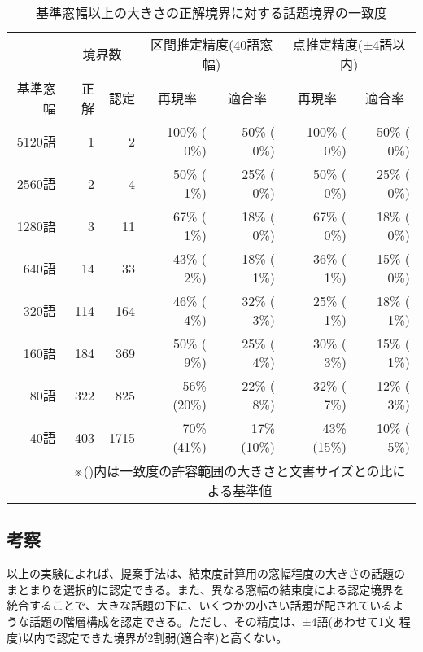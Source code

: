 \begin{table}[htbp]
  \begin{center}
    \leavevmode
    \caption{基準窓幅以上の大きさの正解境界に対する話題境界の一致度}
    \label{tab:大きさ別の再現率と適合率(総合)}
    
    
    \begin{tabular}{|r||r|r||r|r||r|r|}
      \hline
      & \multicolumn{2}{c||}{境界数}
      & \multicolumn{2}{c||}{区間推定精度(40語窓幅)}
      & \multicolumn{2}{c|}{点推定精度(±4語以内)} \\
      \cline{2-7}
      基準窓幅  & 正解 & 認定
        & \multicolumn{1}{c|}{再現率} & \multicolumn{1}{c||}{適合率}
        & \multicolumn{1}{c|}{再現率} & \multicolumn{1}{c|}{適合率} \\
      \hline
      5120語 &   1 &    2 & 100\% ( 0\%) & 50\% ( 0\%) & 100\% ( 0\%) & 50\% ( 0\%) \\
      2560語 &   2 &    4 &  50\% ( 1\%) & 25\% ( 0\%) &  50\% ( 0\%) & 25\% ( 0\%) \\
      1280語 &   3 &   11 &  67\% ( 1\%) & 18\% ( 0\%) &  67\% ( 0\%) & 18\% ( 0\%) \\
      \hline
       640語 &  14 &   33 &  43\% ( 2\%) & 18\% ( 1\%) &  36\% ( 1\%) & 15\% ( 0\%) \\
       320語 & 114 &  164 &  46\% ( 4\%) & 32\% ( 3\%) &  25\% ( 1\%) & 18\% ( 1\%) \\
       160語 & 184 &  369 &  50\% ( 9\%) & 25\% ( 4\%) &  30\% ( 3\%) & 15\% ( 1\%) \\
        80語 & 322 &  825 &  56\% (20\%) & 22\% ( 8\%) &  32\% ( 7\%) & 12\% ( 3\%) \\
        40語 & 403 & 1715 &  70\% (41\%) & 17\% (10\%) &  43\% (15\%) & 10\% ( 5\%) \\
        \hline
      \multicolumn{1}{c}{}& \multicolumn{6}{c}{※()内は一致度の許容範囲の大きさと文書サイズとの比による基準値} 
    \end{tabular}
  \end{center}
\end{table}

\vspace{-9mm}
\subsection{考察}
\label{sect:考察}

以上の実験によれば、提案手法は、結束度計算用の窓幅程度の大きさの話題の
まとまりを選択的に認定できる。また、異なる窓幅の結束度による認定境界を
統合することで、大きな話題の下に、いくつかの小さい話題が配されているよ
うな話題の階層構成を認定できる。ただし、その精度は、±4語(あわせて1文
程度)以内で認定できた境界が2割弱(適合率)と高くない。

